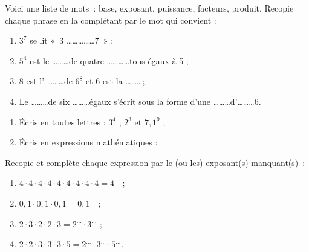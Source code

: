 \begin{exercice}[Vocabulaire]
Voici une liste de mots : base, exposant, puissance, facteurs, produit. Recopie chaque phrase en la complétant par le mot qui convient :
\begin{enumerate}
 \item $3^7$ se lit « 3 \ldots \ldots \ldots \ldots \ldots 7 » ;
 \item $5^4$ est le \ldots \ldots \ldots de quatre \ldots \ldots \ldots \ldots tous égaux à 5 ;
 \item 8 est l' \ldots \ldots \ldots de $6^8$ et 6 est la \ldots \ldots \ldots ;
 \item Le \ldots \ldots \ldots de six \ldots \ldots \ldots égaux s'écrit sous la forme d'une \ldots \ldots \ldots d'\ldots \ldots \ldots 6.
 \end{enumerate}
\end{exercice} 

\begin{exercice}
\begin{enumerate}
 \item Écris en toutes lettres : $3^4$ ; $2^3$ et $7,1^9$ ;
 \item Écris en expressions mathématiques :
 \end{enumerate}
\end{exercice}

\begin{exercice}
Recopie et complète chaque expression par le (ou les) exposant(s) manquant(s) :
\begin{enumerate}
 \item $4 \cdot 4 \cdot 4 \cdot 4 \cdot 4 \cdot 4 \cdot 4 \cdot 4 \cdot 4 = 4^{...}$ ;
 \item $0,1 \cdot 0,1 \cdot 0,1 = 0,1^{...}$ ;
 \item $2 \cdot 3 \cdot 2 \cdot 2 \cdot 3 = 2^{...} \cdot 3^{...}$ ;
 \item $2 \cdot 2 \cdot 3 \cdot 3 \cdot 3 \cdot 5 = 2^{...} \cdot 3^{...} \cdot 5^{...}$.
 \end{enumerate}
\end{exercice}

